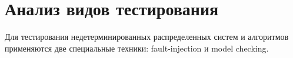 \section{Анализ видов тестирования}
\label{sec:analysis}

Для тестирования недетерминированных распределенных систем и алгоритмов применяются две специальные техники: fault-injection и model checking.





